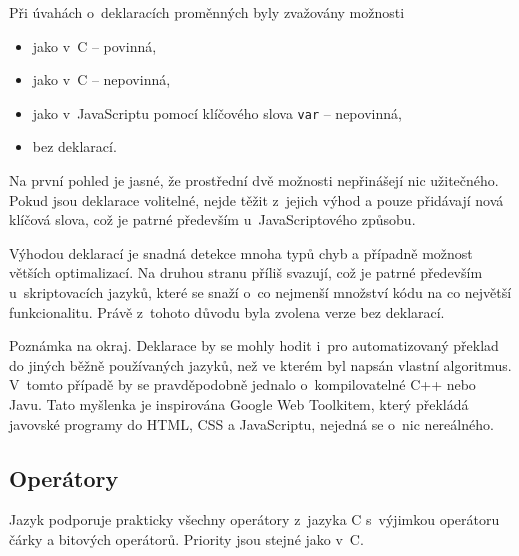 \documentclass[11pt,twoside,a4paper]{book}
\begin{document}
Při úvahách o~deklaracích proměnných byly zvažovány možnosti

\begin{itemize}
\item jako v~C -- povinná,
\item jako v~C -- nepovinná,
\item jako v~JavaScriptu pomocí klíčového slova \texttt{var} -- nepovinná,
\item bez deklarací.
\end{itemize}

Na první pohled je jasné, že prostřední dvě možnosti nepřinášejí nic užitečného. Pokud jsou deklarace volitelné, nejde těžit z~jejich výhod a pouze přidávají nová klíčová slova, což je patrné především u~JavaScriptového způsobu.

Výhodou deklarací je snadná detekce mnoha typů chyb a případně možnost větších optimalizací. Na druhou stranu příliš svazují, což je patrné především u~skriptovacích jazyků, které se snaží o~co nejmenší množství kódu na co největší funkcionalitu. Právě z~tohoto důvodu byla zvolena verze bez deklarací.

Poznámka na okraj. Deklarace by se mohly hodit i~pro automatizovaný překlad do jiných běžně používaných jazyků, než ve kterém byl napsán vlastní algoritmus. V~tomto případě by se pravděpodobně jednalo o~kompilovatelné C++ nebo Javu. Tato myšlenka je inspirována Google Web Toolkitem, který překládá javovské programy do HTML, CSS a JavaScriptu, nejedná se o~nic nereálného.


\subsection{Operátory}

Jazyk podporuje prakticky všechny operátory z~jazyka C s~výjimkou operátoru čárky a bitových operátorů. Priority jsou stejné jako v~C.
\end{document}
